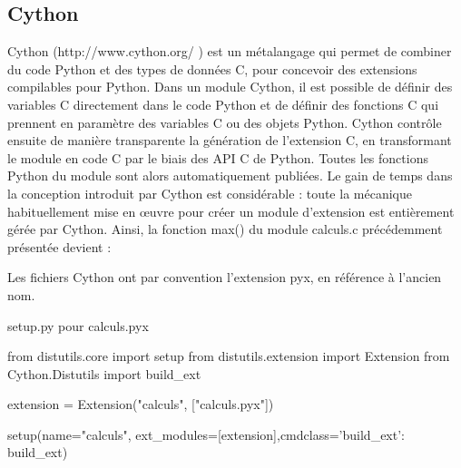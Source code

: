 \subsection{Cython}
Cython (http://www.cython.org/ ) est un métalangage qui permet de combiner du code
Python et des types de donn\'ees C, pour concevoir des extensions compilables pour
Python.
Dans un module Cython, il est possible de définir des variables C directement dans
le code Python et de définir des fonctions C qui prennent en paramètre des
variables C ou des objets Python.
Cython contr\^ole ensuite de manière transparente la génération de l’extension C, en
transformant le module en code C par le biais des API C de Python.
Toutes les fonctions Python du module sont alors automatiquement publiées.
Le gain de temps dans la conception introduit par Cython est considérable : toute la
mécanique habituellement mise en œuvre pour créer un module d’extension est
entièrement gérée par Cython.
Ainsi, la fonction max() du module calculs.c pr\'ec\'edemment présent\'ee devient :

Les fichiers Cython ont par convention l’extension pyx, en référence à l’ancien nom.

setup.py pour calculs.pyx

\begin{python}
from distutils.core import setup
from distutils.extension import Extension
from Cython.Distutils import build_ext

extension = Extension("calculs", ["calculs.pyx"])

setup(name="calculs", ext_modules=[extension],cmdclass={'build_ext': build_ext})

\end{python}
